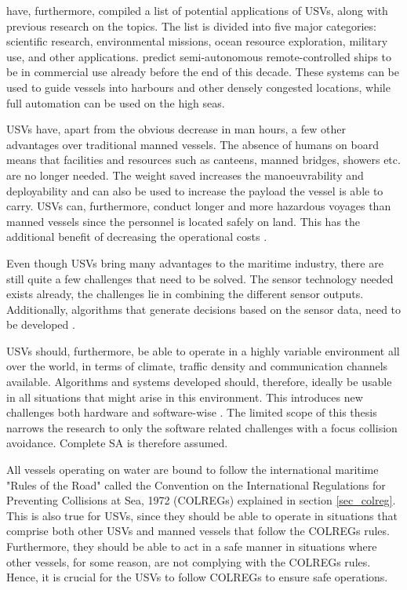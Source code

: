 \textcite{liu2016unmanned} have, furthermore, compiled a list of potential applications of USVs, along with previous research on the topics.
The list is divided into five major categories: scientific research, environmental missions, ocean resource exploration, military use, and other applications.
\textcite{jokioinen2016remote} predict semi-autonomous remote-controlled ships to be in commercial use already before the end of this decade. These systems can be used to guide vessels into harbours and other densely congested locations, while full automation can be used on the high seas.

USVs have, apart from the obvious decrease in man hours, a few other advantages over traditional manned vessels. The absence of humans on board means that facilities and resources such as canteens,  manned bridges, showers etc. are no longer needed. The weight saved increases the manoeuvrability and deployability and can also be used to increase the payload the vessel is able to carry. USVs can, furthermore, conduct longer and more hazardous voyages than manned vessels since the personnel is located safely on land. This has the additional benefit of decreasing the operational costs \cite{liu2016unmanned,jokioinen2016remote}.



Even though USVs bring many advantages to the maritime industry, there are still quite a few challenges that need to be solved. The sensor technology needed exists already, the challenges lie in combining the different sensor outputs. Additionally, algorithms that generate decisions based on the sensor data, need to be developed \cite{jokioinen2016remote}.

USVs should, furthermore, be able to operate in a highly variable environment all over the world, in terms of climate, traffic density and communication channels available.  Algorithms and systems developed should, therefore, ideally be usable in all situations that might arise in this environment. This introduces new challenges both hardware and software-wise \cite{liu2016unmanned}. The limited scope of this thesis narrows the research to only the software related challenges with a focus collision avoidance. Complete SA is therefore assumed.

All vessels operating on water are bound to follow the international maritime "Rules of the Road" called the Convention on the International Regulations for Preventing Collisions at Sea, 1972 (COLREGs) explained in section \ref{sec_colreg}. This is also true for USVs, since they should be able to operate in situations that comprise both other USVs and manned vessels that follow the COLREGs rules. Furthermore, they should be able to  act in a safe manner in situations where other vessels, for some reason, are not complying with the COLREGs rules. Hence, it is crucial for the USVs to follow COLREGs to ensure safe operations.

